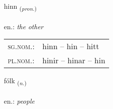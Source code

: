 \documentclass[frontgrid, backgrid]{flacards}\usepackage[]{graphicx}\usepackage[]{xcolor}
\begin{document}
\renewcommand{\blhead}{\vskip5pt {\small\bfseries\footnotesize Fornafn | Pronoun }}
\renewcommand{\bcfoot}{\vskip5pt \hspace{2pt}{\small\bfseries\footnotesize 1K}}


{hinn \small{\textsubscript{(\textit{pron.})}} \\[1ex] %
\textphonetic{[hɪn]} \\
en.: \emph{the other} \\  [2ex]
\renewcommand*{\arraystretch}{0.8}
\begin{tabular}{ll}
\textsc{sg.nom.}: & hinn  --  hin -- hitt \\ 
\textsc{pl.nom.}: & hinir -- hinar -- hin
\end{tabular}
}

\renewcommand{\flhead}{\vskip5pt \fboxsep=0pt {\small\bfseries\footnotesize Nafnorð | Noun}}
\renewcommand{\fcfoot}{\vskip5pt \fboxsep=0pt \hspace{2pt}{\small\bfseries\footnotesize 1K}}

\renewcommand{\blhead}{\vskip5pt {\small\bfseries\footnotesize Nafnorð | Noun }}
\renewcommand{\bcfoot}{\vskip5pt \hspace{2pt}{\small\bfseries\footnotesize 1K}}


{fólk \small{\textsubscript{(\textit{n.})}} \\[1ex] %
\textphonetic{[foul̥k]} \\
en.: \emph{people} \\  [2ex]
\renewcommand*{\arraystretch}{0.8}
}

\renewcommand{\flhead}{\vskip5pt \fboxsep=0pt {\small\bfseries\footnotesize Sagnorð | Verb}}
\renewcommand{\fcfoot}{\vskip5pt \fboxsep=0pt \hspace{2pt}{\small\bfseries\footnotesize 1K}}
\end{document}
